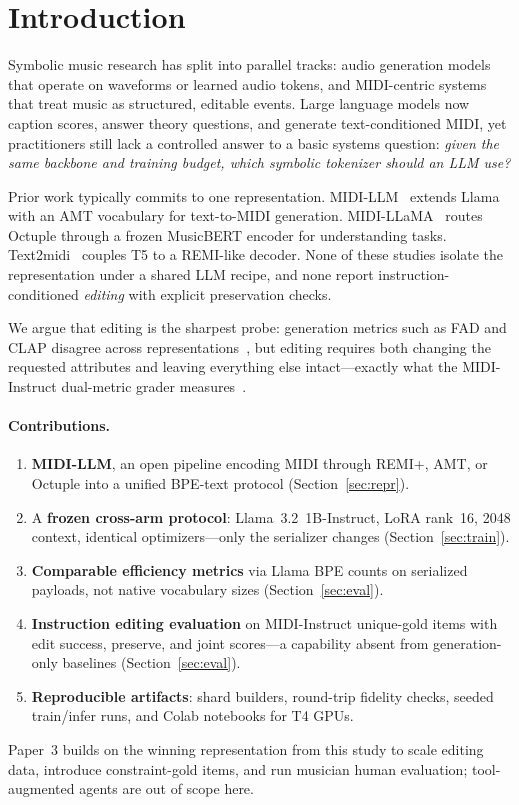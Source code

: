 \section{Introduction}

Symbolic music research has split into parallel tracks: audio generation models that operate on waveforms or learned audio tokens, and MIDI-centric systems that treat music as structured, editable events. Large language models now caption scores, answer theory questions, and generate text-conditioned MIDI, yet practitioners still lack a controlled answer to a basic systems question: \emph{given the same backbone and training budget, which symbolic tokenizer should an LLM use?}

Prior work typically commits to one representation. MIDI-LLM~\cite{wu2026midillm} extends Llama with an AMT vocabulary for text-to-MIDI generation. MIDI-LLaMA~\cite{midillama2026} routes Octuple through a frozen MusicBERT encoder for understanding tasks. Text2midi~\cite{text2midi2025} couples T5 to a REMI-like decoder. None of these studies isolate the representation under a shared LLM recipe, and none report instruction-conditioned \emph{editing} with explicit preservation checks.

We argue that editing is the sharpest probe: generation metrics such as FAD and CLAP disagree across representations~\cite{kumar2026abc}, but editing requires both changing the requested attributes and leaving everything else intact---exactly what the MIDI-Instruct dual-metric grader measures~\cite{goh2026midiinstruct}.

\paragraph{Contributions.}
\begin{enumerate}[leftmargin=*]
\item \textbf{MIDI-LLM}, an open pipeline encoding MIDI through REMI+, AMT, or Octuple into a unified BPE-text protocol (Section~\ref{sec:repr}).
\item A \textbf{frozen cross-arm protocol}: Llama~3.2~1B-Instruct, LoRA rank~16, 2048 context, identical optimizers---only the serializer changes (Section~\ref{sec:train}).
\item \textbf{Comparable efficiency metrics} via Llama BPE counts on serialized payloads, not native vocabulary sizes (Section~\ref{sec:eval}).
\item \textbf{Instruction editing evaluation} on MIDI-Instruct unique-gold items with edit success, preserve, and joint scores---a capability absent from generation-only baselines (Section~\ref{sec:eval}).
\item \textbf{Reproducible artifacts}: shard builders, round-trip fidelity checks, seeded train/infer runs, and Colab notebooks for T4 GPUs.
\end{enumerate}

Paper~3 builds on the winning representation from this study to scale editing data, introduce constraint-gold items, and run musician human evaluation; tool-augmented agents are out of scope here.
